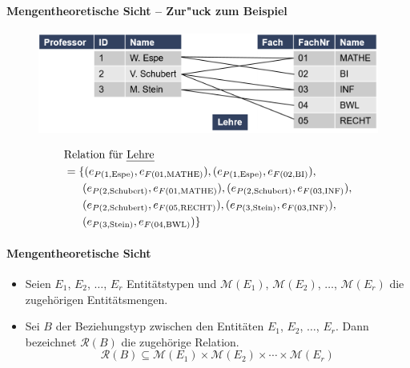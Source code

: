 \begin{frame}{\insertsection}
\framesubtitle{Mengentheoretische Sicht -- Zur"uck zum Beispiel}
\centering 
\begin{minipage}[c]{0.5\linewidth}
\begin{figure} 
	\includegraphics[scale=0.45]{img/ERM-BeispielRelationLehreProfessorFach.png}
\end{figure}
\end{minipage}
\abs 
\begin{minipage}[c]{0.5\linewidth}
\begin{equation*}
\begin{split} 
&\text{Relation f\"ur \emph{Lehre}}\\
&=\{(e_{P(1, \text{Espe})}, e_{F(01,\text{MATHE})}),(e_{P(1, \text{Espe})}, e_{F(02,\text{BI})}),\\
&\quad\,\,\,\,(e_{P(2,\text{Schubert})}, e_{F(01,\text{MATHE})}),(e_{P(2,\text{Schubert})}, e_{F(03,\text{INF})}),\\
&\quad\,\,\,\,(e_{P(2,\text{Schubert})}, e_{F(05,\text{RECHT})}),(e_{P(3, \text{Stein})}, e_{F(03,\text{INF})}),\\
&\quad\,\,\,\,(e_{P(3, \text{Stein})}, e_{F(04,\text{BWL})})\}
\end{split}
\end{equation*}
\end{minipage}
\end{frame} 

\begin{frame}{\insertsection}
\framesubtitle{Mengentheoretische Sicht}
\begin{itemize}
	\item Seien $E_1$, $E_2$, $\ldots$, $E_r$ Entit\"atstypen und $\mathcal{M}(E_1)$, $\mathcal{M}(E_2)$, $\ldots$, $\mathcal{M}(E_r)$ 
	die zugeh\"origen Entit\"atsmengen.
	\item Sei $B$ der Beziehungstyp zwischen den Entit\"aten $E_1$, $E_2$, $\ldots$, $E_r$. 
	Dann bezeichnet $\mathcal{R}(B)$ die zugeh\"orige Relation. 
	\begin{equation*} 
	\mathcal{R}(B)\subseteq	\mathcal{M}(E_1)\times\mathcal{M}(E_2)\times\cdots\times\mathcal{M}(E_r)
	\end{equation*} 
\end{itemize}
\end{frame} 

